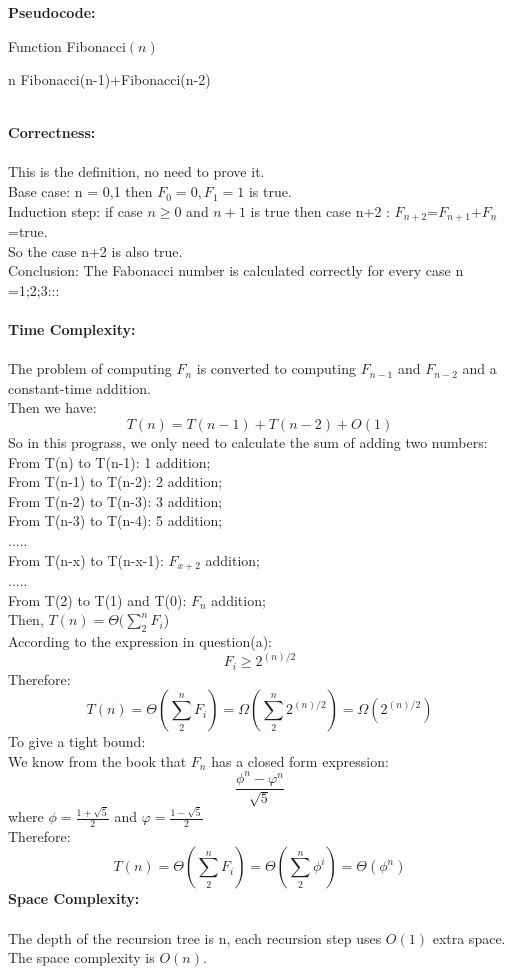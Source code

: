\documentclass{article}
\begin{document}
\subsubsection{}
\textbf{\large Pseudocode:}
\begin{algorithm}
  \caption{Function Fibonacci$(n)$}
  \label{alg1}
  \begin{algorithmic}
  \RETURN n
  \ENDIF
  \RETURN Fibonacci(n-1)+Fibonacci(n-2)
  \end{algorithmic}
\end{algorithm}\\
\textbf{\large Correctness:}\\\\
This is the definition, no need to prove it.\\
Base case: n = 0,1 then $F_0=0,F_1=1$ is true.\\
Induction step: if case $n \ge 0$ and $n+1$ is true then case n+2 : $F_{n+2}$=$F_{n+1}$+$F_{n}$=true.\\
So the case n+2 is also true.\\ 
Conclusion: The Fabonacci number is calculated correctly for every case n =1;2;3:::\\\\
\textbf{\large Time Complexity:}\\\\
The problem of computing $F_n$ is converted to computing $F_{n-1}$ and $F_{n-2}$ and a constant-time addition.\\
Then we have: \\
$$T(n) = T(n-1)+T(n-2)+O(1)$$
So in this prograss, we only need to calculate the sum of adding two numbers:\\
From T(n) to T(n-1): 1 addition;\\
From T(n-1) to T(n-2): 2 addition;\\
From T(n-2) to T(n-3): 3 addition;\\
From T(n-3) to T(n-4): 5 addition;\\
.....\\
From T(n-x) to T(n-x-1): $F_{x+2}$ addition;\\
.....\\
From T(2) to T(1) and T(0): $F_{n}$ addition;\\
Then, $T(n)=\Theta (\sum_2^n F_i$)\\
According to the expression in question(a):
$$F_i \ge 2^{(n)/2}$$
Therefore: 
$$T(n)=\Theta(\sum_2^n F_i)=\Omega(\sum_2^n 2^{(n)/2})=\Omega (2^{(n)/2})$$
To give a tight bound:\\
We know from the book that $F_n$ has a closed form expression: $$\frac{\phi^n-\varphi^n}{\sqrt{5}}$$
where $\phi=\frac{1+\sqrt{5}}{2}$ and $\varphi=\frac{1-\sqrt{5}}{2}$\\
Therefore:
$$T(n)=\Theta(\sum_2^n F_i)=\Theta(\sum_2^n \phi^i)=\Theta(\phi^n)$$
\textbf{\large Space Complexity:}\\\\
The depth of the recursion tree is n, each recursion step uses $O(1)$ extra space.\\
The space complexity is $O(n)$.
\end{document}
